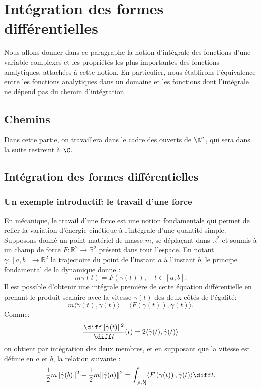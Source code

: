 \chapter{Intégration des formes différentielles}
Nous allons donner dans ce paragraphe la notion d'intégrale des fonctions d'une variable complexes et les propriétés les plus importantes des fonctions analytiques, attachées à cette notion. En particulier, nous établirons l'équivalence entre les fonctions analytiques dans un domaine et les fonctions dont l'intégrale ne dépend pas du chemin d'intégration. 
\section{Chemins}
Dans cette partie, on travaillera dans le cadre des ouverts de $\R^n$, qui sera dans la suite restreint à $\C$. 

\section{Intégration des formes différentielles}
\subsection{Un exemple introductif: le travail d'une force}
En mécanique, le travail d'une force est une notion fondamentale qui
permet de relier la variation d'énergie cinétique à l'intégrale d'une quantité
simple. Supposons donné un point matériel de masse $m$, se déplaçant dans
$\mathbb{R}^2$ et soumis à un champ de force $F \colon \mathbb{R}^2 \to
\mathbb{R}^2$ présent dans tout l'espace. En notant $\gamma \colon [a,b] \to
\mathbb{R}^2$ la trajectoire du point de l'instant $a$ à l'instant $b$, le principe fondamental
de la dynamique donne :
\[
 m \ddot{\gamma}(t) = F\left(\gamma(t)\right), \quad t \in [a,b].
\]
Il est possible d'obtenir une intégrale première de cette équation différentielle en prenant le
produit scalaire avec la vitesse $\dot{\gamma}(t)$ des deux côtés de
l'égalité:
\[
m \langle\ddot{\gamma}(t),\dot{\gamma}(t)\rangle =
\langle F\left(\gamma(t)\right), \dot{\gamma}(t) \rangle.
\]
Comme:
\[
\frac{\diff \|\dot{\gamma}(t)\|^2}{\diff t}(t) = 2
\langle\ddot{\gamma}(t),\dot{\gamma}(t)\rangle
\]
on obtient par intégration des deux membres, et en supposant que la vitesse est
définie en $a$ et $b$, la relation suivante :
\begin{equation}\label{eq:travail_force}
\frac{1}{2}m \|\dot{\gamma}(b)\|^2 - \frac{1}{2}m \|\dot{\gamma}(a)\|^2 =
\int_{[a,b]} \langle F\left(\gamma(t)\right), \dot{\gamma}(t) \rangle
\diff t.
\end{equation}


